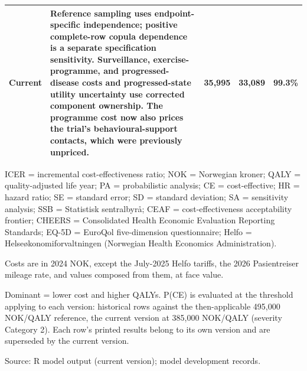 \begin{table}[H]
{\begin{threeparttable}
\begin{tabular}[t]{>{\raggedright\arraybackslash}p{1.2cm}>{\raggedright\arraybackslash}p{7.0cm}>{\raggedright\arraybackslash}p{2.5cm}>{\raggedright\arraybackslash}p{2.0cm}>{\raggedright\arraybackslash}p{1.5cm}}
\textcolor[HTML]{2D3748}{Current} & \textcolor[HTML]{2D3748}{Reference sampling uses endpoint-specific independence; positive complete-row copula dependence is a separate specification sensitivity. Surveillance, exercise-programme, and progressed-disease costs and progressed-state utility uncertainty use corrected component ownership. The programme cost now also prices the trial's behavioural-support contacts, which were previously unpriced.} & \textcolor[HTML]{2D3748}{35,995} & \textcolor[HTML]{2D3748}{33,089} & \textcolor[HTML]{2D3748}{99.3\%}\\
\bottomrule
\end{tabular}
\begin{tablenotes}
\item ICER = incremental cost-effectiveness ratio; NOK = Norwegian kroner; QALY = quality-adjusted life year; PA = probabilistic analysis; CE = cost-effective; HR = hazard ratio; SE = standard error; SD = standard deviation; SA = sensitivity analysis; SSB = Statistisk sentralbyrå; CEAF = cost-effectiveness acceptability frontier; CHEERS = Consolidated Health Economic Evaluation Reporting Standards; EQ-5D = EuroQol five-dimension questionnaire; Helfo = Helseøkonomiforvaltningen (Norwegian Health Economics Administration).
\item Costs are in 2024 NOK, except the July-2025 Helfo tariffs, the 2026 Pasientreiser mileage rate, and values composed from them, at face value.
\item Dominant = lower cost and higher QALYs. P(CE) is evaluated at the threshold applying to each version: historical rows against the then-applicable 495,000 NOK/QALY reference, the current version at 385,000 NOK/QALY (severity Category 2). Each row's printed results belong to its own version and are superseded by the current version.
\item Source: R model output (current version); model development records.
\end{tablenotes}
\end{threeparttable}
}
\end{table}
